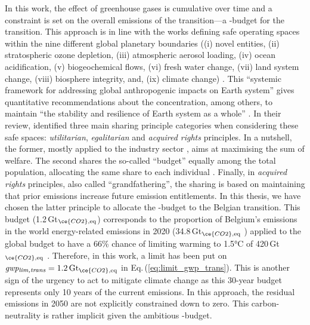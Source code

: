 In this work, the effect of greenhouse gases is cumulative over time and a constraint is set on the overall emissions of the transition---a -budget for the transition. This approach is in line with the works defining safe operating spaces within the nine different global planetary boundaries (\ie (i) novel entities, (ii) stratospheric ozone depletion, (iii) atmospheric aerosol loading, (iv) ocean acidification, (v) biogeochemical flows, (vi) fresh water change, (vii) land system change, (viii) biosphere integrity, and, (ix) climate change) \cite{richardson2023earth,steffen2015planetary,rockstrom2009safe}. This ``systemic framework for addressing global anthropogenic impacts on Earth system'' gives quantitative recommendations about the  concentration, among others, to maintain ``the stability and resilience of Earth system as a whole'' \cite{richardson2023earth}. In their review, \citet{ryberg2020downscaling} identified three main sharing principle categories when considering these safe spaces: \ie \textit{utilitarian}, \textit{egalitarian} and \textit{acquired rights} principles. In a nutshell, the former, mostly applied to the industry sector \cite{ryberg2018bring,brejnrod2017absolute}, aims at maximising the sum of welfare. The second shares the so-called ``budget'' equally among the total population, allocating the same share to each individual \cite{hoff2017bringing,o2018good}. Finally, in \textit{acquired rights} principles, also called ``grandfathering'', the sharing is based on \og maintaining that prior emissions increase future emission entitlements\fg  \cite{knight2013grandfathering}. In this thesis, we have chosen the latter principle to allocate the -budget to the Belgian transition. This budget (1.2\,Gt$_{\ce{CO2},\text{eq}}$) corresponds to the proportion of Belgium's emissions in the world energy-related emissions in 2020 (34.8\,Gt$_{\ce{CO2},\text{eq}}$ \cite{ourworldindata_CO2_world}) applied to the global budget to have a 66\% chance of limiting warming to 1.5°C of 420\,Gt$_{\ce{CO2},\text{eq}}$ \cite{IPCC_CO2_budget}. Therefore, in this work, a limit has been put on $\emph{gwp\textsubscript{lim,trans}}=1.2\,\text{Gt}_{\ce{CO2},\text{eq}}$ in Eq.\,(\ref{eq:limit_gwp_trans}). This is another sign of the urgency to act to mitigate climate change as this 30-year budget represents only 10 years of the current emissions.  In this approach, the residual emissions in 2050 are not explicitly constrained down to zero. This carbon-neutrality is rather implicit given the ambitious -budget.

